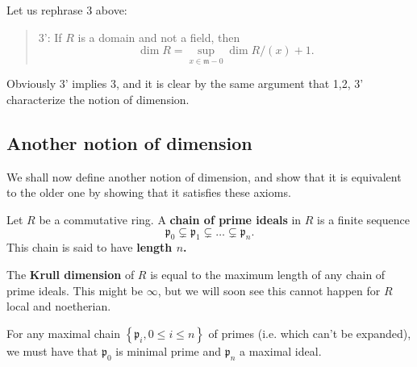 Let us rephrase 3 above:
\begin{quote}
3': If $R$ is a domain and not a field, then 
\[ \dim R = \sup_{x \in \mathfrak{m} - 0} \dim R/(x) + 1. \]
\end{quote}
Obviously 3' implies 3, and it is clear by the same argument that 1,2, 3'
characterize the notion of dimension.

\subsection{Another notion of dimension} We shall now define another notion of
dimension, and show that it is equivalent to the older one by showing that it
satisfies these axioms.

\begin{definition} 
Let $R$ be a commutative ring. A \textbf{chain of prime ideals} in $R$ is a finite
sequence
\[ \mathfrak{p}_0 \subsetneq \mathfrak{p}_1 \subsetneq \dots \subsetneq
\mathfrak{p}_n.  \]
This chain is said to have \textbf{length $n$.}
\end{definition} 

\begin{definition} 
The \textbf{Krull dimension} of $R$ is equal to the maximum length of any chain
of prime ideals. This might be $\infty$, but we will soon see this cannot
happen for $R$ local and noetherian.
\end{definition} 

\begin{remark} 
For any maximal chain $\left\{\mathfrak{p}_i, 0 \leq i \leq n\right\}$ of primes (i.e. which can't be expanded), we must have
that $\mathfrak{p}_0$ is minimal prime and $\mathfrak{p}_n$ a maximal ideal.
\end{remark} 

